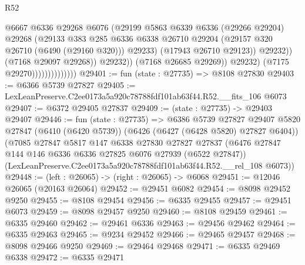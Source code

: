 \begin{lexlean}{R52}
\begin{coremodule}
                                            @6667
                                            @6336
                                            @29268
                                            @6076
                                            (@29199
                                              @5863
                                              @6339
                                              @6336
                                              (@29266 @29204)
                                              @29268
                                              (@29133
                                                @383
                                                @285
                                                @6336
                                                @6338
                                                @26710
                                                @29204
                                                (@29157 @320 @26710 (@6490 (@29160 @320)))
                                                @29233)
                                              (@17943 @26710 @29123))
                                            @29232))
                                        (@7168 @29097 @29268))
                                      @29232))
                                  (@7168 @26685 @29269))
                                @29232)
                              (@7175 @29270))))))))))))))
@29401 := fun (state : @27735) => @8108 @27830
@29403 := @6366 @5739 @27827
@29405 := LexLeanPreserve.C2ee0173a5a920c78788fdf101ab63f44.R52.__fits_106 @6073
@29407 := @6372 @29405 @27837
@29409 := (state : @27735) -> @29403 @29407
@29446 := fun (state : @27735) =>
  @6386
    @5739
    @27827
    @29407
    @5820
    @27847
    (@6410 (@6420 @5739))
    (@6426 (@6427 (@6428 @5820) @27827 @6404))
    (@7085
      @27847
      @5817
      @147
      @6338
      @27830
      @27827
      @27837
      (@6476 @27847 @144 @146 @6336 @6336 @27825 @6076 @27939 (@6522 @27847))
      (LexLeanPreserve.C2ee0173a5a920c78788fdf101ab63f44.R52.__rel_108 @6073))
@29448 := (left : @26065) -> (right : @26065) -> @6068
@29451 := @12046 @26065 (@20163 @26064)
@29452 := @29451 @6082
@29454 := @8098 @29452 @9250
@29455 := @8108 @29454
@29456 := @6335 @29455
@29457 := @29451 @6073
@29459 := @8098 @29457 @9250
@29460 := @8108 @29459
@29461 := @6335 @29460
@29462 := @29461 @6336
@29463 := @29456 @29462
@29464 := @6335 @29463
@29465 := @9234 @29452
@29466 := @29465 @29457
@29468 := @8098 @29466 @9250
@29469 := @29464 @29468
@29471 := @6335 @29469 @6338
@29472 := @6335 @29471

\end{coremodule}
\end{lexlean}
